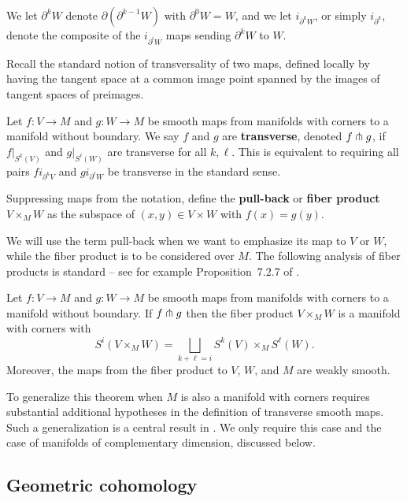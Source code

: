 We let $\partial^k W$ denote $\partial (\partial^{k-1} W)$ with $\partial^0 W = W$, and we let $i_{\partial^k W}$, or simply $i_{\partial^k}$, denote the composite of the $i_{\partial^i W}$ maps sending $\partial^k W$ to $W$.

Recall the standard notion of transversality of two maps, defined locally by having the tangent space at a common image point spanned by the images of tangent spaces of preimages.

\begin{definition}
	Let $f \colon V \to M$ and $g \colon W \to M$ be smooth maps from manifolds with corners to a manifold without boundary.
	We say $f$ and $g$ are \textbf{transverse}, denoted $f \pitchfork g$, if $f|_{S^k(V)}$ and $g|_{S^\ell(W)}$ are transverse for all $k, \ell$. This is equivalent to requiring all pairs $fi_{\partial^kV}$ and $gi_{\partial^\ell W}$ be transverse in the standard sense.

	Suppressing maps from the notation, define the \textbf{pull-back} or \textbf{fiber product} $V \times_M W$ as the subspace of $(x, y) \in V \times W$ with $f(x) = g(y)$.
\end{definition}

We will use the term pull-back when we want to emphasize its map to $V$ or $W$, while the fiber product is to be considered over $M$.
The following analysis of fiber products is standard -- see for example Proposition~7.2.7 of \cite{MaDo92}.

\begin{theorem}\label{pullback}
	Let $f \colon V \to M$ and $g \colon W \to M$ be smooth maps from manifolds with corners to a manifold without boundary.
	If $f \pitchfork g$ then the fiber product $V \times_M W$ is a manifold with corners with
	\begin{equation*}
		S^i(V \times_M W) = \bigsqcup_{k + \ell = i} S^k(V) \times_M S^\ell(W).
	\end{equation*}
	Moreover, the maps from the fiber product to $V$, $W$, and $M$ are weakly smooth.
\end{theorem}

To generalize this theorem when $M$ is also a manifold with corners requires substantial additional hypotheses in the definition of transverse smooth maps.
Such a generalization is a central result in \cite{Joy12}. We only require this case and the case of manifolds of complementary dimension, discussed below.

\subsection{Geometric cohomology}

